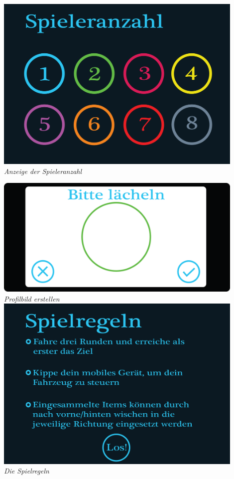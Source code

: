 \begin{flushright}
\includegraphics[width=0.9\textwidth]{img/spieleranzahl.png}\\
\textit{Anzeige der Spieleranzahl}

\newpage

\includegraphics[width=0.9\textwidth]{img/profilbild_erstellen.png}\\
\textit{Profilbild erstellen}\\[4em]

\includegraphics[width=0.9\textwidth]{img/spielregeln.png}\\
\textit{Die Spielregeln}


\end{flushright}
